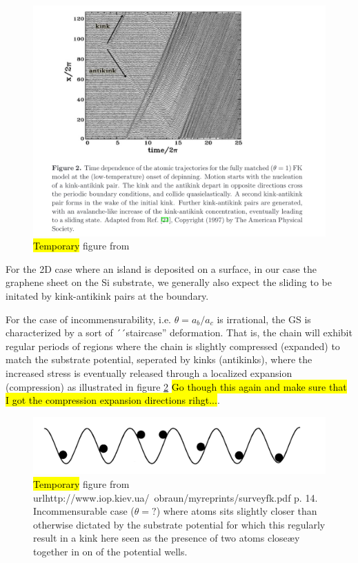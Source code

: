\begin{figure}[H]
  \centering
  \includegraphics[width=0.8\linewidth]{figures/theory/kink_antikink.png}
  \caption{\hl{Temporary} figure from \cite{Manini_2016}}
  \label{fig:kink_antikink}
\end{figure}

For the 2D case where an island is deposited on a surface, in our case the graphene sheet on the Si substrate, we generally also expect the sliding to be initated by kink-antikink pairs at the boundary. 

For the case of incommensurability, i.e. $\theta = a_b/a_c$ is irrational, the
GS is characterized by a sort of ´´staircase'' deformation. That is, the chain
will exhibit regular periods of regions where the chain is slightly compressed
(expanded) to match the substrate potential, seperated by kinks (antikinks),
where the increased stress is eventually released through a localized expansion
(compression) as illustrated in figure \ref{fig:incommensurable_example} \hl{Go though this again and make sure that I got the compression expansion directions rihgt...}.

\begin{figure}[H]
  \centering
  \includegraphics[width=0.5\linewidth]{figures/theory/incommensurable_example.png}
  \caption{\hl{Temporary} figure from
  url{http://www.iop.kiev.ua/~obraun/myreprints/surveyfk.pdf} p. 14.
  Incommensurable case ($\theta = ?$) where atoms sits slightly closer than
  otherwise dictated by the substrate potential for which this regularly result
  in a kink here seen as the presence of two atoms closeæy together in on of the
  potential wells.}
  \label{fig:incommensurable_example}
\end{figure}

